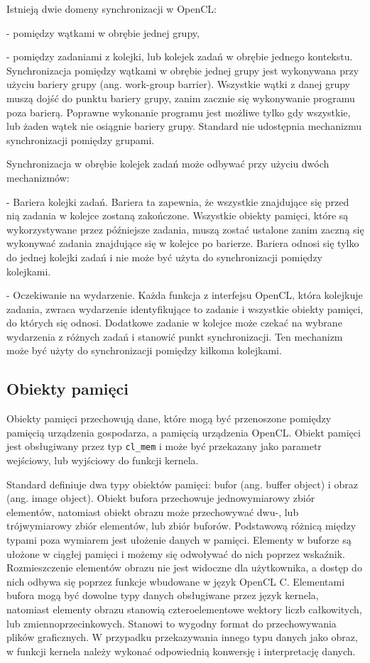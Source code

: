 Istnieją dwie domeny synchronizacji w OpenCL:

- pomiędzy wątkami w obrębie jednej grupy,

- pomiędzy zadaniami z kolejki, lub kolejek zadań w obrębie jednego kontekstu.\\

Synchronizacja pomiędzy wątkami w obrębie jednej grupy jest wykonywana przy użyciu bariery grupy (ang. work-group barrier). Wszystkie wątki z danej grupy muszą dojść do punktu bariery grupy, zanim zacznie się wykonywanie programu poza barierą. Poprawne wykonanie programu jest możliwe tylko gdy wszystkie, lub żaden wątek nie osiągnie bariery grupy. Standard nie udostępnia mechanizmu synchronizacji pomiędzy grupami.

Synchronizacja w obrębie kolejek zadań może odbywać przy użyciu dwóch mechanizmów:

- Bariera kolejki zadań. Bariera ta zapewnia, że wszystkie znajdujące się przed nią zadania w kolejce zostaną zakończone. Wszystkie obiekty pamięci, które są wykorzystywane przez późniejsze zadania, muszą zostać ustalone zanim zaczną się wykonywać zadania znajdujące się w kolejce po barierze. Bariera odnosi się tylko do jednej kolejki zadań i nie może być użyta do synchronizacji pomiędzy kolejkami. 

- Oczekiwanie na wydarzenie. Każda funkcja z interfejsu OpenCL, która kolejkuje zadania, zwraca wydarzenie identyfikujące to zadanie i wszystkie obiekty pamięci, do których się odnosi. Dodatkowe zadanie w kolejce może czekać na wybrane wydarzenia z różnych zadań i stanowić punkt synchronizacji. Ten mechanizm może być użyty do synchronizacji pomiędzy kilkoma kolejkami.

\subsection{Obiekty pamięci}\label{sec:OpenC61asdL}

Obiekty pamięci przechowują dane, które mogą być przenoszone pomiędzy pamięcią urządzenia gospodarza, a pamięcią urządzenia OpenCL. Obiekt pamięci jest obsługiwany przez typ \verb|cl_mem| i może być przekazany jako parametr wejściowy, lub wyjściowy do funkcji kernela.

Standard definiuje dwa typy obiektów pamięci: bufor (ang. buffer object) i obraz (ang. image object). Obiekt bufora przechowuje jednowymiarowy zbiór elementów, natomiast obiekt obrazu może przechowywać dwu-, lub trójwymiarowy zbiór elementów, lub zbiór buforów. Podstawową różnicą między typami poza wymiarem jest ułożenie danych w pamięci. Elementy w buforze są ułożone w ciągłej pamięci i możemy się odwoływać do nich poprzez wskaźnik. Rozmieszczenie elementów obrazu nie jest widoczne dla użytkownika, a dostęp do nich odbywa się poprzez funkcje wbudowane w język OpenCL C. Elementami bufora mogą być dowolne typy danych obsługiwane przez język kernela, natomiast elementy obrazu stanowią czteroelementowe wektory liczb całkowitych, lub zmiennoprzecinkowych. Stanowi to wygodny format do przechowywania plików graficznych. W przypadku przekazywania innego typu danych jako obraz, w funkcji kernela należy wykonać odpowiednią konwersję i interpretację danych.

